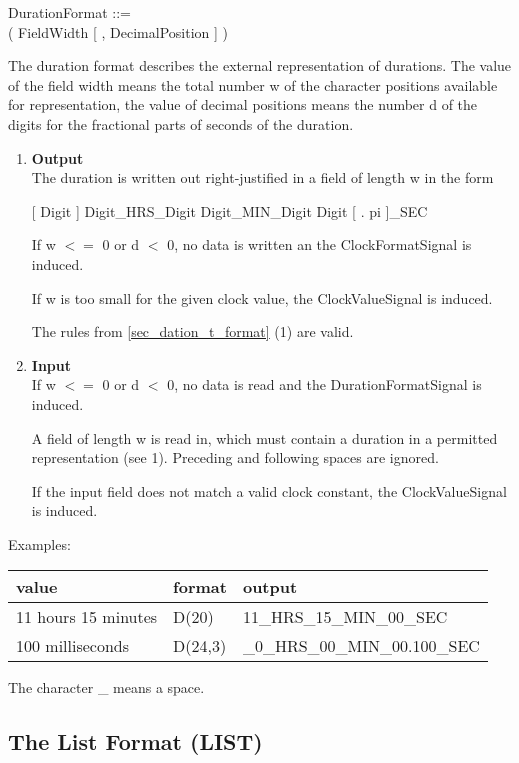 DurationFormat ::=\\
 ( FieldWidth [ , DecimalPosition ] )

The duration format describes the external representation of durations.
The value of the field width means the total number w of the character
positions available for representation, the value of decimal positions
means the number d of the digits for the fractional parts of seconds of
the duration.
\begin{enumerate}
\item {\bf Output}\\
The duration is written out right-justified in a field of length w in
the form

[ Digit ] Digit\_HRS\_Digit Digit\_MIN\_Digit Digit [ . pi ]\_SEC

\begin{added}
If w $<=$ 0 or d $<$ 0, no data is written an the ClockFormatSignal
   is induced.

If w is too small for the given clock value, the ClockValueSignal
   is induced.
\end{added}

\begin{removed}
The rules from \ref{sec_dation_t_format} (1) are valid.
\end{removed}
\item {\bf Input}\\
If w $<=$ 0 or d $<$ 0, no data is read and the DurationFormatSignal
   is induced.

\begin{added}
A field of length w is read in, which must contain a duration in a
permitted representation (see 1). Preceding and following spaces are
ignored.

If the input field does not match a valid clock constant, the 
   ClockValueSignal is induced.
\end{added}
\end{enumerate}

Examples:

\begin{tabular}{lll}
value               & format  & output \\ \hline
11 hours 15 minutes & D(20)   & 11\_HRS\_15\_MIN\_00\_SEC \\
100 milliseconds    & D(24,3) & \_0\_HRS\_00\_MIN\_00.100\_SEC
\end{tabular}

The character \_ means a space.

\subsection{The List Format (LIST)}    %
\label{sec_dation_list_format}

